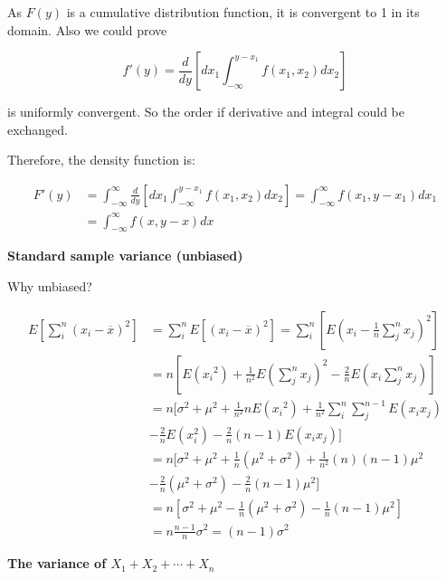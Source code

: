 \documentclass{article}
\begin{document}
As \(F(y)\) is a cumulative distribution function, it is convergent to 1 in its domain. Also we could prove 

\begin{equation}
f'(y)=\frac{d}{dy}[dx_1\int_{-\infty}^{y-x_1}f(x_1,x_2)dx_2]
\end{equation}

is uniformly
convergent. So the order if derivative and integral could be exchanged.

Therefore, the density function is:

\begin{equation}
\begin{split}
F'(y)&=\int_{-\infty}^{\infty}\frac{d}{dy}[dx_1\int_{-\infty}^{y-x_1}f(x_1,x_2)dx_2]=\int_{-\infty}^{\infty}f(x_1,y-x_1)dx_1\\
&=\int_{-\infty}^{\infty}f(x,y-x)dx
\end{split}
\end{equation}


\vspace{3mm}

\textbf{Standard sample variance (unbiased)}

Why unbiased?

\begin{equation*}
\begin{split}
    E[\sum_{i}^n(x_i-\overline{x})^2]&=\sum_i^nE[(x_i-\overline{x})^2]=\sum_i^n[E(x_i-\frac{1}{n}\sum_{j}^nx_j)^2]\\
    &=n[E({x_i}^2)+\frac{1}{n^2}E(\sum_{j}^nx_j)^2-\frac{2}{n}E(x_i\sum_{j}^nx_j)]\\
    &=n[\sigma^2+\mu^2+\frac{1}{n^2}nE({x_i}^2)+\frac{1}{n^2}\sum_{i}^{n}\sum_{j}^{n-1}E(x_ix_j)\\
    &-\frac{2}{n}E(x_i^2)-\frac{2}{n}(n-1)E(x_ix_j)]\\
    &=n[\sigma^2+\mu^2+\frac{1}{n}(\mu^2+\sigma^2)+\frac{1}{n^2}(n)(n-1)\mu^2\\
    &-\frac{2}{n}(\mu^2+\sigma^2)-\frac{2}{n}(n-1)\mu^2]\\
    &=n[\sigma^2+\mu^2-\frac{1}{n}(\mu^2+\sigma^2)-\frac{1}{n}(n-1)\mu^2]\\
    &=n\frac{n-1}{n}\sigma^2=(n-1)\sigma^2
\end{split}
\end{equation*}

\vspace{3mm}

\textbf{The variance of \(X_1+X_2+\cdots+X_n\)}
\end{document}
